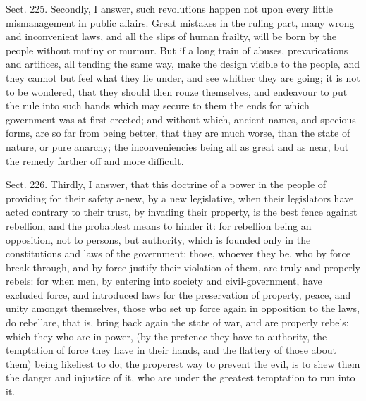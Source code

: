\documentclass[11pt,openany]{book}
\begin{document}
Sect. 225. Secondly, I answer, such revolutions happen not upon every little mismanagement in public affairs. Great mistakes in the ruling part, many wrong and inconvenient laws, and all the slips of human frailty, will be born by the people without mutiny or murmur. But if a long train of abuses, prevarications and artifices, all tending the same way, make the design visible to the people, and they cannot but feel what they lie under, and see whither they are going; it is not to be wondered, that they should then rouze themselves, and endeavour to put the rule into such hands which may secure to them the ends for which government was at first erected; and without which, ancient names, and specious forms, are so far from being better, that they are much worse, than the state of nature, or pure anarchy; the inconveniencies being all as great and as near, but the remedy farther off and more difficult.

Sect. 226. Thirdly, I answer, that this doctrine of a power in the people of providing for their safety a-new, by a new legislative, when their legislators have acted contrary to their trust, by invading their property, is the best fence against rebellion, and the probablest means to hinder it: for rebellion being an opposition, not to persons, but authority, which is founded only in the constitutions and laws of the government; those, whoever they be, who by force break through, and by force justify their violation of them, are truly and properly rebels: for when men, by entering into society and civil-government, have excluded force, and introduced laws for the preservation of property, peace, and unity amongst themselves, those who set up force again in opposition to the laws, do rebellare, that is, bring back again the state of war, and are properly rebels: which they who are in power, (by the pretence they have to authority, the temptation of force they have in their hands, and the flattery of those about them) being likeliest to do; the properest way to prevent the evil, is to shew them the danger and injustice of it, who are under the greatest temptation to run into it.
\end{document}
